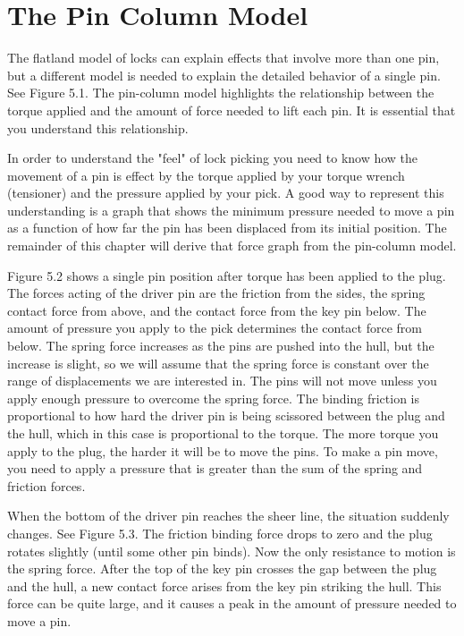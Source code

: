 \chapter{The Pin Column Model}
The flatland model of locks can explain effects that involve more than one pin, but a different model is needed to explain the detailed behavior of a single pin.
See Figure 5.1.
The pin-column model highlights the relationship between the torque applied and the amount of force needed to lift each pin.
It is essential that you understand this relationship.

In order to understand the "feel" of lock picking you need to know how the movement of a pin is effect by the torque applied by your torque wrench (tensioner) and the pressure applied by your pick.
A good way to represent this understanding is a graph that shows the minimum pressure needed to move a pin as a function of how far the pin has been displaced from its initial position.
The remainder of this chapter will derive that force graph from the pin-column model.

Figure 5.2 shows a single pin position after torque has been applied to the plug.
The forces acting of the driver pin are the friction from the sides, the spring contact force from above, and the contact force from the key pin below.
The amount of pressure you apply to the pick determines the contact force from below.
The spring force increases as the pins are pushed into the hull, but the increase is slight, so we will assume that the spring force is constant over the range of displacements we are interested in.
The pins will not move unless you apply enough pressure to overcome the spring force.
The binding friction is proportional to how hard the driver pin is being scissored between the plug and the hull, which in this case is proportional to the torque.
The more torque you apply to the plug, the harder it will be to move the pins.
To make a pin move, you need to apply a pressure that is greater than the sum of the spring and friction forces.

When the bottom of the driver pin reaches the sheer line, the situation suddenly changes.
See Figure 5.3. The friction binding force drops to zero and the plug rotates slightly (until some other pin binds).
Now the only resistance to motion is the spring force.
After the top of the key pin crosses the gap between the plug and the hull, a new contact force arises from the key pin striking the hull.
This force can be quite large, and it causes a peak in the amount of pressure needed to move a pin.

